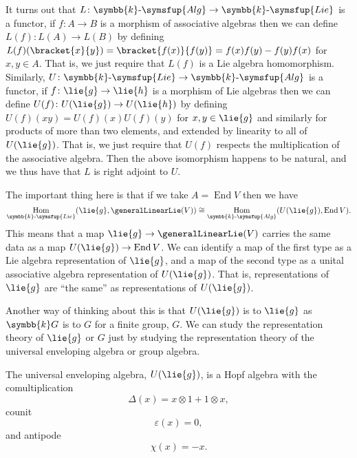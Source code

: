 \documentclass[fleqn]{NotesClass}
\makeatletter
\renewcommand{\field}{\symbb{k}}
\DeclareMathOperator{\End}{End}
\DeclareMathOperator{\Hom}{Hom}
\newcommand{\c@egory}[1]{\symsfup{#1}}
\newcommand{\Alg}[1][\field]{{#1}\text{-}\c@egory{Alg}}
\newcommand{\Lie}[1][\field]{{#1}\text{-}\c@egory{Lie}}
\newcommand{\isomorphic}{\cong}
\makeatother
\begin{document}
    It turns out that \(L \colon \Alg \to \Lie\) is a functor, if \(f \colon A \to B\) is a morphism of associative algebras then we can define \(L(f) \colon L(A) \to L(B)\) by defining \(L(f)(\bracket{x}{y}) = \bracket{f(x)}{f(y)} = f(x)f(y) - f(y)f(x)\) for \(x, y \in A\).
    That is, we just require that \(L(f)\) is a Lie algebra homomorphism.
    Similarly, \(U \colon \Lie \to \Alg\) is a functor, if \(f \colon \lie{g} \to \lie{h}\) is a morphism of Lie algebras then we can define \(U(f) \colon U(\lie{g}) \to U(\lie{h})\) by defining \(U(f)(xy) = U(f)(x) U(f)(y)\) for \(x, y \in \lie{g}\) and similarly for products of more than two elements, and extended by linearity to all of \(U(\lie{g})\).
    That is, we just require that \(U(f)\) respects the multiplication of the associative algebra.
    Then the above isomorphism happens to be natural, and we thus have that \(L\) is right adjoint to \(U\).
    
    The important thing here is that if we take \(A = \End V\) then we have
    \begin{equation}
        \Hom_{\Lie}(\lie{g}, \generalLinearLie(V)) \isomorphic \Hom_{\Alg}(U(\lie{g}), \End V).
    \end{equation}
    This means that a map \(\lie{g} \to \generalLinearLie(V)\) carries the same data as a map \(U(\lie{g}) \to \End V\).
    We can identify a map of the first type as a Lie algebra representation of \(\lie{g}\), and a map of the second type as a unital associative algebra representation of \(U(\lie{g})\).
    That is, representations of \(\lie{g}\) are \enquote{the same} as representations of \(U(\lie{g})\).
    
    Another way of thinking about this is that \(U(\lie{g})\) is to \(\lie{g}\) as \(\field G\) is to \(G\) for a finite group, \(G\).
    We can study the representation theory of \(\lie{g}\) or \(G\) just by studying the representation theory of the universal enveloping algebra or group algebra.
    
    \begin{prp}{}{}
        The universal enveloping algebra, \(U(\lie{g})\), is a Hopf algebra with the comultiplication
        \begin{equation}
            \Delta(x) = x \otimes 1 + 1 \otimes x,
        \end{equation}
        counit
        \begin{equation}
            \varepsilon(x) = 0,
        \end{equation}
        and antipode
        \begin{equation}
            \chi(x) = -x.
        \end{equation}
    \end{prp}
    
\end{document}
